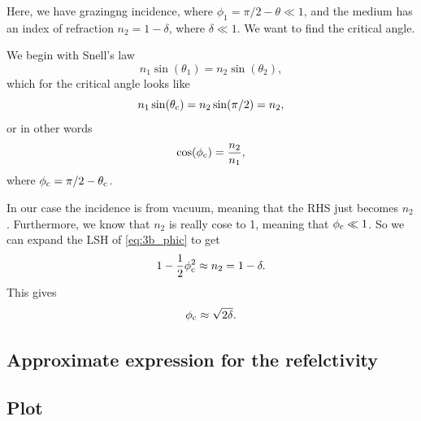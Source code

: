 \documentclass[11pt,letter, swedish, english
]{article}
\begin{document}
Here, we have grazingng incidence, where 
$\phi_1=\pi/2 - \theta\ll1$, and the medium has an index of refraction
$n_2=1-\delta$, where $\delta\ll1$. We want to find the critical angle. 

We begin with Snell's law 
\begin{equation}
n_1\sin(\theta_1) = n_2\sin(\theta_2),
\end{equation}
which for the critical angle looks like
\begin{equation}
n_1\sin(\theta_\text{c}) = n_2\sin(\pi/2) = n_2,
\end{equation}
or in other words
\begin{equation}\label{eq:3b_phic}
\cos(\phi_\text{c}) = \frac{n_2}{n_1},
\end{equation}
where $\phi_\text{c}=\pi/2-\theta_\text{c}$.


In our case the incidence is from vacuum, meaning that the RHS just
becomes $n_2$. Furthermore, we know that $n_2$ is really cose to 1,
meaning that $\phi_\text{c}\ll1$. So we can expand the LSH of
\eqref{eq:3b_phic} to get
\begin{equation}
1-\frac{1}{2}\phi_\text{c}^2 \approx n_2 = 1-\delta.
\end{equation}
This gives
\begin{equation}
\phi_\text{c} \approx \sqrt{2\delta}.
\end{equation}


\subsection{Approximate expression for the refelctivity}


\subsection{Plot}
\end{document}
